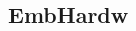 \documentclass[10pt,a4paper,landscape]{article}
\begin{document}
\begin{multicols*}{2}
    \section*{EmbHardw}
    
    
\end{multicols*}
\end{document}
